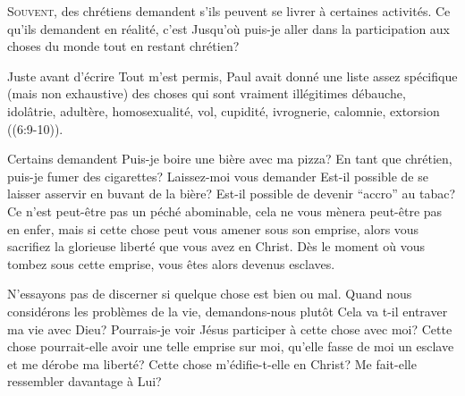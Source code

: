 \dvrule








\lettrine{S}{ouvent}, 
 des chrétiens demandent s'ils peuvent se livrer
 à certaines activités. Ce qu'ils demandent en réalité,
 c'est\frcolon{}
 \Og Jusqu'où puis-je aller dans la participation
 aux choses du monde tout en restant chrétien? \Fg{}

Juste avant d'écrire \Og Tout m'est permis, \Fg{}
 Paul avait donné une liste assez spécifique
 (mais non exhaustive) des choses qui sont vraiment illégitimes\frcolon{}
 débauche, idolâtrie, adultère, homosexualité,
 vol, cupidité, ivrognerie, calomnie, extorsion
 ((6:9-10)).


Certains demandent\frcolon{}
 \Og Puis-je boire une bière avec ma pizza?
 En tant que chrétien, puis-je fumer des cigarettes? \Fg{}
 Laissez-moi vous demander\frcolon{} 
 \Og Est-il possible de se laisser asservir en buvant de la bière?
 Est-il possible de devenir ``accro'' au tabac? \Fg{}
 Ce n'est peut-être pas un péché abominable,
 cela ne vous mènera peut-être pas en enfer,
 mais si cette chose peut vous amener sous son emprise,
 alors vous sacrifiez la glorieuse liberté que vous avez en Christ.
 Dès le moment où vous tombez sous cette emprise,
 vous êtes alors devenus esclaves.

N'essayons pas de discerner si quelque chose est bien ou mal.
 Quand nous considérons les problèmes de la vie,
 demandons-nous plutôt\frcolon{} \Og {}
 Cela va t-il entraver ma vie avec Dieu?
 Pourrais-je voir Jésus participer à cette chose avec moi?
 Cette chose pourrait-elle avoir une telle emprise sur moi,
 qu'elle fasse de moi un esclave et me dérobe ma liberté?
 Cette chose m'édifie-t-elle en Christ?
 Me fait-elle ressembler davantage à Lui? \Fg{}

